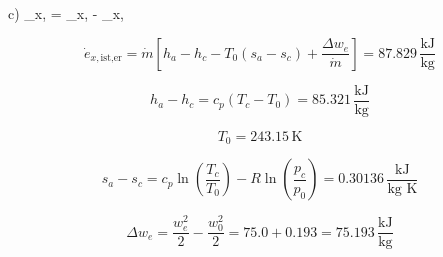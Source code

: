 c) \quad {}_{x, } = _{x, } - _{x, }

\[
\dot{e}_{x, \text{ist,er}} = \dot{m} \left[ h_a - h_c - T_0 (s_a - s_c) + \frac{\Delta w_e}{\dot{m}} \right] = 87.829 \, \frac{\text{kJ}}{\text{kg}}
\]

\[
h_a - h_c = c_p (T_c - T_0) = 85.321 \, \frac{\text{kJ}}{\text{kg}}
\]

\[
T_0 = 243.15 \, \text{K}
\]

\[
s_a - s_c = c_p \ln \left( \frac{T_c}{T_0} \right) - R \ln \left( \frac{p_c}{p_0} \right) = 0.30136 \, \frac{\text{kJ}}{\text{kg K}}
\]

\[
\Delta w_e = \frac{w_e^2}{2} - \frac{w_0^2}{2} = 75.0 + 0.193 = 75.193 \, \frac{\text{kJ}}{\text{kg}}
\]